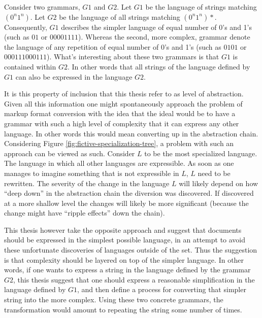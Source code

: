 \documentclass{scrreprt}
\begin{document}
Consider two grammars, $G1$ and $G2$. Let $G1$ be the language of strings matching $(0^n 1^n)$. Let $G2$ be the language of all strings matching $(0^n 1^n)*$. Consequently, $G1$ describes the simpler language of equal number of 0's and 1's (such as $01$ or $00001111$). Whereas the second, more complex, grammar denote the language of any repetition of equal number of 0's and 1's (such as $0101$ or $000111000111$). What's interesting about these two grammars is that $G1$ is contained within $G2$. In other words that all strings of the language defined by $G1$ can also be expressed in the language $G2$.

It is this property of inclusion that this thesis refer to as level of abstraction. Given all this information one might spontaneously approach the problem of markup format conversion with the idea that the ideal would be to have a grammar with such a high level of complexity that it can express any other language. In other words this would mean converting up in the abstraction chain. Considering Figure \ref{fig:fictive-specialization-tree}, a problem with such an approach can be viewed as such. Consider $L$ to be the most specialized language. The language in which all other languages are expressible. As soon as one manages to imagine something that is not expressible in $L$, $L$ need to be rewritten. The severity of the change in the language $L$ will likely depend on how ``deep down'' in the abstraction chain the diversion was discovered. If discovered at a more shallow level the changes will likely be more significant (because the change might have ``ripple effects'' down the chain).


This thesis however take the opposite approach and suggest that documents should be expressed in the simplest possible language, in an attempt to avoid these unfortunate discoveries of languages outside of the set. Thus the suggestion is that complexity should be layered on top of the simpler language. In other words, if one wants to express a string in the language defined by the grammar $G2$, this thesis suggest that one should express a reasonable simplification in the language defined by $G1$, and then define a process for converting that simpler string into the more complex. Using these two concrete grammars, the transformation would amount to repeating the string some number of times.
\end{document}
